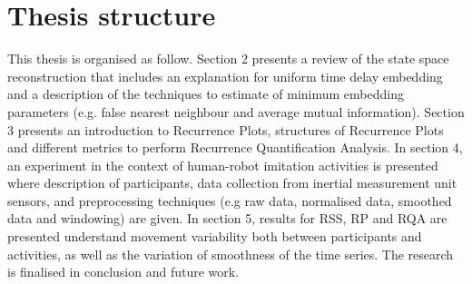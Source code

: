 \section{Thesis structure}

This thesis is organised as follow. 
Section 2 presents a review of the state space reconstruction 
that includes an explanation for uniform time delay embedding and a 
description of the techniques to estimate of minimum embedding 
parameters (e.g. false nearest neighbour and average mutual information).
Section 3 presents an introduction to Recurrence Plots,
structures of Recurrence Plots and different metrics to perform 
Recurrence Quantification Analysis.
In section 4, an experiment in the context of human-robot imitation
activities is presented where description of participants, data collection 
from inertial measurement unit sensors,
and preprocessing techniques (e.g raw data, normalised data, smoothed data 
and windowing) are given.
In section 5, results for RSS, RP and RQA are presented understand 
movement variability both between participants and activities, 
as well as the variation of smoothness of the time series.
The research is finalised in conclusion and future work.



